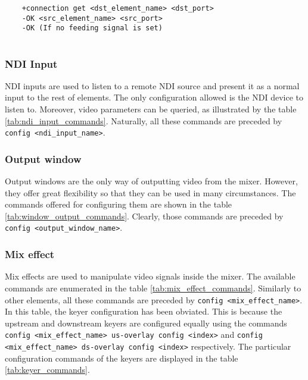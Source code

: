 \documentclass[../main.tex]{subfiles}
\begin{document}
\begin{lstlisting}
    +connection get <dst_element_name> <dst_port>
    -OK <src_element_name> <src_port>
    -OK (If no feeding signal is set)
    
\end{lstlisting}



\subsubsection{NDI Input}

NDI inputs are used to listen to a remote NDI source and present it as a normal input to the rest of elements. The only configuration allowed is the NDI device to listen to. Moreover, video parameters can be queried, as illustrated by the table \ref{tab:ndi_input_commands}. Naturally, all these commands are preceded by \texttt{config <ndi\_input\_name>}.\newline



\subsubsection{Output window}

Output windows are the only way of outputting video from the mixer. However, they offer great flexibility so that they can be used in many circumstances. The commands offered for configuring them are shown in the table \ref{tab:window_output_commands}. Clearly, those commands are preceded by \texttt{config <output\_window\_name>}.\newline



\subsubsection{Mix effect}

Mix effects are used to manipulate video signals inside the mixer. The available commands are enumerated in the table \ref{tab:mix_effect_commands}. Similarly to other elements, all these commands are preceded by \texttt{config <mix\_effect\_name>}. In this table, the keyer configuration has been obviated. This is because the upstream and downstream keyers are configured equally using the commands \texttt{config <mix\_effect\_name> us-overlay config <index>} and \texttt{config <mix\_effect\_name> ds-overlay config <index>} respectively. The particular configuration commands of the keyers are displayed in the table \ref{tab:keyer_commands}.
\end{document}
